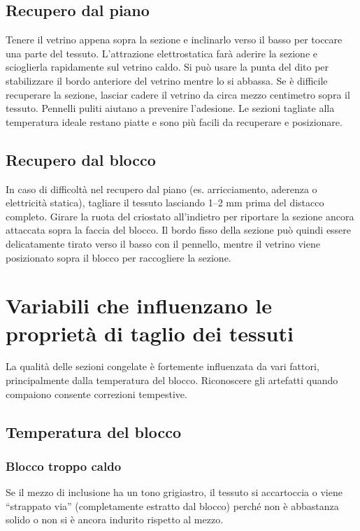 \subsection{Recupero dal piano}
Tenere il vetrino appena sopra la sezione e inclinarlo verso il basso per toccare una parte del tessuto. L'attrazione elettrostatica farà aderire la sezione e scioglierla rapidamente sul vetrino caldo. Si può usare la punta del dito per stabilizzare il bordo anteriore del vetrino mentre lo si abbassa. Se è difficile recuperare la sezione, lasciar cadere il vetrino da circa mezzo centimetro sopra il tessuto. Pennelli puliti aiutano a prevenire l'adesione. Le sezioni tagliate alla temperatura ideale restano piatte e sono più facili da recuperare e posizionare.

\subsection{Recupero dal blocco} 
In caso di difficoltà nel recupero dal piano (es. arricciamento, aderenza o elettricità statica), tagliare il tessuto lasciando 1–2 mm prima del distacco completo. Girare la ruota del criostato all'indietro per riportare la sezione ancora attaccata sopra la faccia del blocco. Il bordo fisso della sezione può quindi essere delicatamente tirato verso il basso con il pennello, mentre il vetrino viene posizionato sopra il blocco per raccogliere la sezione.

\section{Variabili che influenzano le proprietà di taglio dei tessuti}
La qualità delle sezioni congelate è fortemente influenzata da vari fattori, principalmente dalla temperatura del blocco. Riconoscere gli artefatti quando compaiono consente correzioni tempestive.

\subsection{Temperatura del blocco}
\subsubsection{Blocco troppo caldo} 
Se il mezzo di inclusione ha un tono grigiastro, il tessuto si accartoccia o viene “strappato via” (completamente estratto dal blocco) perché non è abbastanza solido o non si è ancora indurito rispetto al mezzo.

